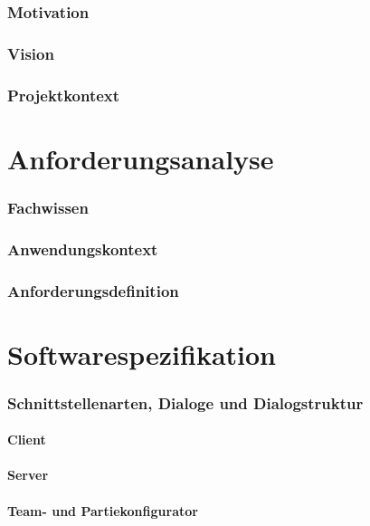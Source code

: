 \documentclass[a4paper,12pt,
headsepline,           %
oneside,               %
pointlessnumbers,      %
bibtotoc,              %
]{scrartcl}
\begin{document}
    \section{Motivation}
    \section{Vision}
    \section{Projektkontext}

    \part{Anforderungsanalyse} 
    \section{Fachwissen}
    
    \section{Anwendungskontext}
    
    \section{Anforderungsdefinition}
    
     

    \part{Softwarespezifikation}
    \section{Schnittstellenarten, Dialoge und Dialogstruktur}
    \subsection{Client}
    
    \subsection{Server}
    
    \subsection{Team- und Partiekonfigurator}
    
\end{document}
